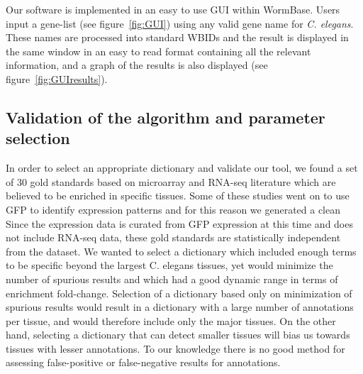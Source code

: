 \documentclass[linenumbers, doublespacing]{bmcart}
\begin{document}
	Our software is implemented in an easy to use GUI within WormBase. Users input a gene-list (see figure~\ref{fig:GUI}) using any valid gene name for \emph{C. elegans}. These names are processed into standard WBIDs and the result is displayed in the same window in an easy to read format containing all the relevant information, and a graph of the results is also displayed (see figure~\ref{fig:GUIresults}).
	
\subsection*{Validation of the algorithm and parameter selection}
	In order to select an appropriate dictionary and validate our tool, we found a set of 30 gold standards based on microarray and RNA-seq literature which are believed to be enriched in specific tissues\cite{}. Some of these studies went on to use GFP to identify expression patterns and for this reason we generated a clean Since the expression data is curated from GFP expression at this time and does not include RNA-seq data, these gold standards are statistically independent from the dataset. We wanted to select a dictionary which included enough terms to be specific beyond the largest C. elegans tissues, yet would minimize the number of spurious results and which had a good dynamic range in terms of enrichment fold-change. Selection of a dictionary based only on minimization of spurious results would result in a dictionary with a large number of annotations per tissue, and would therefore include only the major tissues. On the other hand, selecting a dictionary that can detect smaller tissues will bias us towards tissues with lesser annotations. To our knowledge there is no good method for assessing false-positive or false-negative results for annotations. 
	
\end{document}
